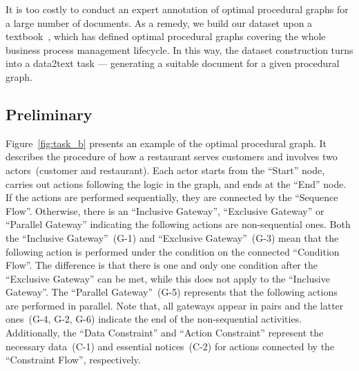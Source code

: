 It is too costly to conduct an expert annotation of optimal procedural graphs for a large number of documents. As a remedy, we build our dataset upon a textbook~\cite{dumas2018fundamentals}, which has defined optimal procedural graphs covering the whole business process management lifecycle. In this way, the dataset construction turns into a data2text task --- generating a suitable document for a given procedural graph.
\subsection{Preliminary}
Figure~\ref{fig:task_b} presents an example of the optimal procedural graph. It describes the procedure of how a restaurant serves customers and involves two actors~(customer and restaurant). 
Each actor starts from the ``Start'' node, carries out actions following the logic in the graph, and ends at the ``End'' node. If the actions are performed sequentially, they are connected by the ``Sequence Flow''. Otherwise, there is an ``Inclusive Gateway'', ``Exclusive Gateway'' or ``Parallel Gateway'' indicating the following actions are non-sequential ones. Both the ``Inclusive Gateway''~(G-1) and ``Exclusive Gateway''~(G-3) mean that the following action is performed under the condition on the connected ``Condition Flow''. The difference is that there is one and only one condition after the ``Exclusive Gateway'' can be met, while this does not apply to the ``Inclusive Gateway''. The ``Parallel Gateway''~(G-5) represents that the following actions are performed in parallel. Note that, all gateways appear in pairs and the latter ones~(G-4, G-2, G-6) indicate the end of the non-sequential activities. Additionally, the ``Data Constraint'' and ``Action Constraint'' represent the necessary data~(C-1) and essential notices~(C-2) for actions connected by the ``Constraint Flow'', respectively.




